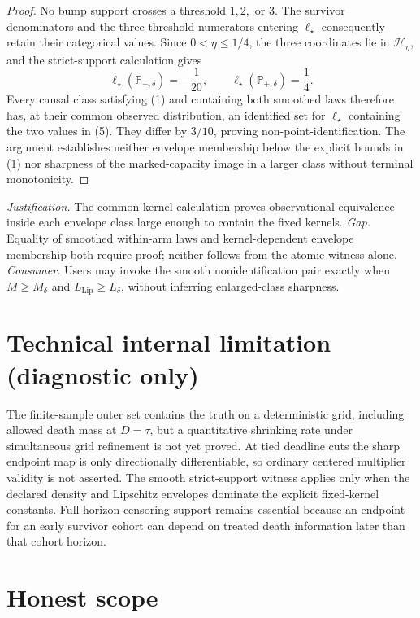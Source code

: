 \documentclass{article}
\begin{document}
\begin{proof}
No bump support crosses a threshold \(1,2,\) or \(3\).  The survivor denominators and the three threshold numerators entering \(\ell_\star\) consequently retain their categorical values.  Since \(0<\eta\leq1/4\), the three coordinates lie in \(\mathcal H_\eta\), and the strict-support calculation gives
\[
 \ell_\star(\mathbb P_{-,\delta})=-\frac1{20},\qquad
 \ell_\star(\mathbb P_{+,\delta})=\frac14. \tag{5}
\]
Every causal class satisfying (1) and containing both smoothed laws therefore has, at their common observed distribution, an identified set for \(\ell_\star\) containing the two values in (5).  They differ by \(3/10\), proving non-point-identification.  The argument establishes neither envelope membership below the explicit bounds in (1) nor sharpness of the marked-capacity image in a larger class without terminal monotonicity.
\end{proof}
\par\smallskip\noindent \textit{Justification.} The common-kernel calculation proves observational equivalence inside each envelope class large enough to contain the fixed kernels. \textit{Gap.} Equality of smoothed within-arm laws and kernel-dependent envelope membership both require proof; neither follows from the atomic witness alone. \textit{Consumer.} Users may invoke the smooth nonidentification pair exactly when \(M\geq M_\delta\) and \(L_{\mathrm{Lip}}\geq L_\delta\), without inferring enlarged-class sharpness.

\section*{Technical internal limitation (diagnostic only)}

The finite-sample outer set contains the truth on a deterministic grid, including allowed death mass at \(D=\tau\), but a quantitative shrinking rate under simultaneous grid refinement is not yet proved.  At tied deadline cuts the sharp endpoint map is only directionally differentiable, so ordinary centered multiplier validity is not asserted.  The smooth strict-support witness applies only when the declared density and Lipschitz envelopes dominate the explicit fixed-kernel constants.  Full-horizon censoring support remains essential because an endpoint for an early survivor cohort can depend on treated death information later than that cohort horizon.

\section{Honest scope}
\end{document}
